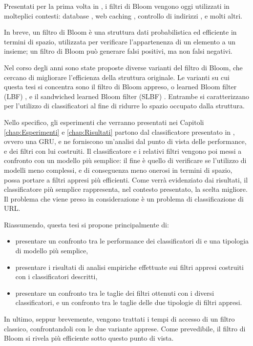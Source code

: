 \documentclass[../../main.tex]{subfiles}
\begin{document}
    
    Presentati per la prima volta in \cite{Bloom1970SpacetimeTI}, i filtri di Bloom vengono oggi utilizzati in molteplici contesti: database \cite{kraska2018case}, web caching \cite{Maggs15algorithmicnuggets}, controllo di indirizzi \cite{Dharmapurikar2006LongestPM}, e molti altri.

    In breve, un filtro di Bloom è una struttura dati probabilistica ed efficiente in termini di spazio, utilizzata per verificare l'appartenenza di un elemento a un insieme; un filtro di Bloom può generare falsi positivi, ma non falsi negativi.

    Nel corso degli anni sono state proposte diverse varianti del filtro di Bloom, che cercano di migliorare l'efficienza della struttura originale. Le varianti su cui questa tesi si concentra sono il filtro di Bloom appreso, o learned Bloom filter (LBF) \cite{kraska2018case}, e il sandwiched learned Bloom filter (SLBF) \cite{10.5555/3326943.3326986}. Entrambe si caratterizzano per l'utilizzo di classificatori al fine di ridurre lo spazio occupato dalla struttura.

    Nello specifico, gli esperimenti che verranno presentati nei Capitoli \ref{chap:Esperimenti} e \ref{chap:Risultati} partono dal classificatore presentato in \cite{ma2020}, ovvero una GRU, e ne forniscono un'analisi dal punto di vista delle performance, e dei filtri con lui costruiti. Il classificatore e i relativi filtri vengono poi messi a confronto con un modello più semplice: il fine è quello di verificare se l'utilizzo di modelli meno complessi, e di conseguenza meno onerosi in termini di spazio, possa portare a filtri appresi più efficienti. Come verrà evidenziato dai risultati, il classificatore più semplice rappresenta, nel contesto presentato, la scelta migliore.
    Il problema che viene preso in considerazione è un problema di classificazione di URL.

    Riassumendo, questa tesi si propone principalmente di: 
    \begin{itemize}
        \item presentare un confronto tra le performance dei classificatori di \cite{ma2020} e una tipologia di modello più semplice,
        \item presentare i risultati di analisi empiriche effettuate sui filtri appresi costruiti con i classificatori descritti,
        \item presentare un confronto tra le taglie dei filtri ottenuti con i diversi classificatori, e un confronto tra le taglie delle due tipologie di filtri appresi.
    \end{itemize}
    In ultimo, seppur brevemente, vengono trattati i tempi di accesso di un filtro classico, confrontandoli con le due variante apprese. Come prevedibile, il filtro di Bloom si rivela più efficiente sotto questo punto di vista. 
\end{document}
